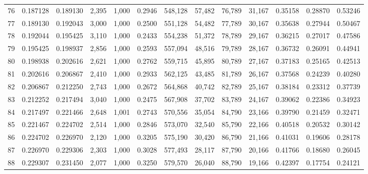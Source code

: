 \begin{tabular}{rrrrrrrrrrrrr}
76  &  0.187128 &  0.189130 &   2,395 &  1,000 &                                     0.2946 &  548,128 &   57,482 &   76,789 &   31,167 &  0.35158 &  0.28870 &  0.53246 \\
77  &  0.189130 &  0.192043 &   3,000 &  1,000 &                                     0.2500 &  551,128 &   54,482 &   77,789 &   30,167 &  0.35638 &  0.27944 &  0.50467 \\
78  &  0.192044 &  0.195425 &   3,110 &  1,000 &                                     0.2433 &  554,238 &   51,372 &   78,789 &   29,167 &  0.36215 &  0.27017 &  0.47586 \\
79  &  0.195425 &  0.198937 &   2,856 &  1,000 &                                     0.2593 &  557,094 &   48,516 &   79,789 &   28,167 &  0.36732 &  0.26091 &  0.44941 \\
80  &  0.198938 &  0.202616 &   2,621 &  1,000 &                                     0.2762 &  559,715 &   45,895 &   80,789 &   27,167 &  0.37183 &  0.25165 &  0.42513 \\
81  &  0.202616 &  0.206867 &   2,410 &  1,000 &                                     0.2933 &  562,125 &   43,485 &   81,789 &   26,167 &  0.37568 &  0.24239 &  0.40280 \\
82  &  0.206867 &  0.212250 &   2,743 &  1,000 &                                     0.2672 &  564,868 &   40,742 &   82,789 &   25,167 &  0.38184 &  0.23312 &  0.37739 \\
83  &  0.212252 &  0.217494 &   3,040 &  1,000 &                                     0.2475 &  567,908 &   37,702 &   83,789 &   24,167 &  0.39062 &  0.22386 &  0.34923 \\
84  &  0.217497 &  0.221466 &   2,648 &  1,001 &                                     0.2743 &  570,556 &   35,054 &   84,790 &   23,166 &  0.39790 &  0.21459 &  0.32471 \\
85  &  0.221467 &  0.224702 &   2,514 &  1,000 &                                     0.2846 &  573,070 &   32,540 &   85,790 &   22,166 &  0.40518 &  0.20532 &  0.30142 \\
86  &  0.224702 &  0.226970 &   2,120 &  1,000 &                                     0.3205 &  575,190 &   30,420 &   86,790 &   21,166 &  0.41031 &  0.19606 &  0.28178 \\
87  &  0.226970 &  0.229306 &   2,303 &  1,000 &                                     0.3028 &  577,493 &   28,117 &   87,790 &   20,166 &  0.41766 &  0.18680 &  0.26045 \\
88  &  0.229307 &  0.231450 &   2,077 &  1,000 &                                     0.3250 &  579,570 &   26,040 &   88,790 &   19,166 &  0.42397 &  0.17754 &  0.24121 \\

\end{tabular}
